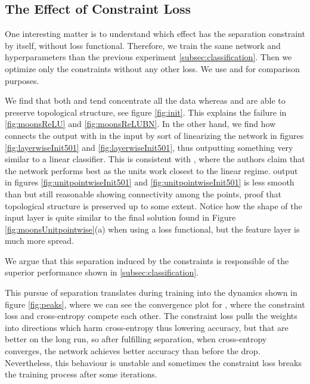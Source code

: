 \subsection{The Effect of Constraint Loss}\label{subsec:effectConstraintLoss}

One interesting matter is to understand which effect has the separation constraint by itself, without loss functional. Therefore, we train the same network and hyperparameters than the previous experiment  \ref{subsec:classification}. Then we optimize only the constraints without any other loss. We use \ReLU and \ReLUBN for comparison purposes. 

We find that both \ReLU and \ReLUBN tend concentrate all the data whereas \SepUnitPoint and \SepLayer are able to preserve topological structure, see figure \ref{fig:init}. This explains the failure in \ref{fig:moonsReLU} and \ref{fig:moonsReLUBN}. 
In the other hand, we find how \SepLayer connects the output with in the input by sort of linearizing the network in figures \ref{fig:layerwiseInit501} and \ref{fig:layerwiseInit501}, thus outputting something very similar to a linear classifier. This is consistent with \cite{batchnormGradientExplosion}, where the authors claim that the network performs best as the units work closest to the linear regime. 
\SepUnitPoint output in figures \ref{fig:unitpointwiseInit501} and \ref{fig:unitpointwiseInit501} is less smooth than \SepLayer but still reasonable showing connectivity among the points, proof that topological structure is preserved up to some extent. Notice how the shape of the input layer is quite similar to the final solution found in Figure \ref{fig:moonsUnitpointwise}(a) when using a loss functional, but the feature layer is much more spread. 

We argue that this separation induced by the constraints is responsible of the superior performance shown in \ref{subsec:classification}.

This pursue of separation translates during training into the dynamics shown in figure \ref{fig:peaks}, where we can see the convergence plot for \SepUnitPoint, where the constraint loss and cross-entropy compete each other. The constraint loss pulls the weights into directions which harm cross-entropy thus lowering accuracy, but that are better on the long run, so after fulfilling separation, when cross-entropy converges, the network achieves better accuracy than before the drop. Nevertheless, this behaviour is unstable and sometimes the constraint loss breaks the training process after some iterations.

